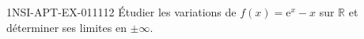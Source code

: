 \begin{exercice}{1NSI-APT-EX-011}{1}{12}
Étudier les variations de $f(x) = \mathrm{e}^x - x$ sur $\mathbb{R}$ et déterminer ses limites en $\pm\infty$.

\end{exercice}
